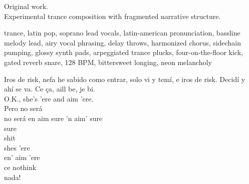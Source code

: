 

\begin{notes}
Original work.\\
Experimental trance composition with fragmented narrative structure.
\end{notes}

\begin{style}
trance, latin pop, soprano lead vocals, latin-american pronunciation, bassline melody lead, airy vocal phrasing, delay throws, harmonized chorus, sidechain pumping, glossy synth pads, arpeggiated trance plucks, four-on-the-floor kick, gated reverb snare, 128 BPM, bittersweet longing, neon melancholy
\end{style}

\begin{lyrics}
Iros de risk, nefa he sabido como entrar, solo vi y temí, e iros de risk.  Decidí y ahí se va.  Ce ça, aill be, je bi.\\
O.K., she's 'ere and aim 'ere.\\
Pero no será\\
no será en aim sure
'n aim' sure\\
sure\\
shit\\
shes 'ere\\
en' aim 'ere\\
ce nothink\\
nada!
\end{lyrics}

